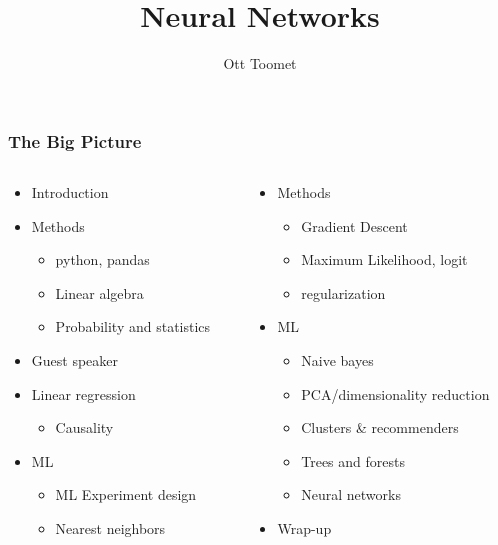 \documentclass[mathserif]{beamer}
\title{Neural Networks}
\author{Ott Toomet}
\begin{document}
\begin{frame}
  \maketitle
\end{frame}

\begin{frame}
  \tableofcontents
\end{frame}

\begin{frame}
\frametitle{The Big Picture}
\begin{columns}
  \begin{column}{0.5\linewidth}
    \begin{itemize}
    \item Introduction
    \item Methods
      \begin{itemize}
      \item python, pandas
      \item Linear algebra
      \item Probability and statistics
      \end{itemize}
    \item Guest speaker
    \item Linear regression
      \begin{itemize}
      \item Causality
      \end{itemize}
    \item ML
      \begin{itemize}
      \item ML Experiment design
      \item Nearest neighbors
      \end{itemize}
    \end{itemize}
  \end{column}
  \begin{column}{0.5\linewidth}
    \begin{itemize}
    \item Methods
      \begin{itemize}
      \item Gradient Descent 
      \item Maximum Likelihood, logit
      \item regularization
      \end{itemize}
    \item ML
      \begin{itemize}
      \item Naive bayes
      \item PCA/dimensionality reduction
      \item Clusters \& recommenders
      \item Trees and forests
      \item \alert{Neural networks}
      \end{itemize}
    \item Wrap-up
    \end{itemize}
  \end{column}
\end{columns}
\end{frame}
\end{document}
